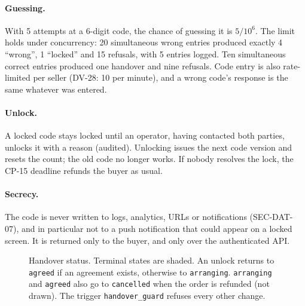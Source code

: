 \documentclass[11pt,a4paper]{article}
\begin{document}
\paragraph{Guessing.} With 5 attempts at a 6-digit code, the chance of guessing it is $5 / 10^6$. The limit holds under concurrency: 20 simultaneous wrong entries produced exactly 4 ``wrong'', 1 ``locked'' and 15 refusals, with 5 entries logged. Ten simultaneous correct entries produced one handover and nine refusals. Code entry is also rate-limited per seller (DV-28: 10 per minute), and a wrong code's response is the same whatever was entered.

\paragraph{Unlock.} A locked code stays locked until an operator, having contacted both parties, unlocks it with a reason (audited). Unlocking issues the next code version and resets the count; the old code no longer works. If nobody resolves the lock, the CP-15 deadline refunds the buyer as usual.

\paragraph{Secrecy.} The code is never written to logs, analytics, URLs or notifications (SEC-DAT-07), and in particular not to a push notification that could appear on a locked screen. It is returned only to the buyer, and only over the authenticated API.

\begin{figure}[!htbp]
\centering
{}
\caption{Handover status. Terminal states are shaded. An unlock returns to \texttt{agreed} if an agreement exists, otherwise to \texttt{arranging}. \texttt{arranging} and \texttt{agreed} also go to \texttt{cancelled} when the order is refunded (not drawn). The trigger \texttt{handover\_guard} refuses every other change.}
\label{fig:handover-states}
\end{figure}
\end{document}
